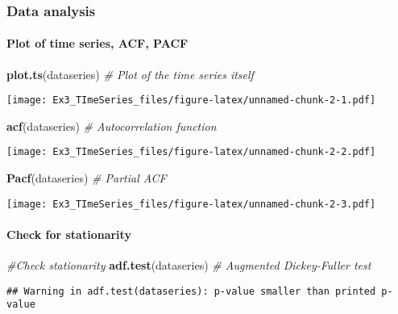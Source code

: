 \documentclass[]{article}
\newenvironment{Shaded}{\begin{snugshade}}{\end{snugshade}}
\newcommand{\KeywordTok}[1]{\textcolor[rgb]{0.13,0.29,0.53}{\textbf{#1}}}
\newcommand{\CommentTok}[1]{\textcolor[rgb]{0.56,0.35,0.01}{\textit{#1}}}
\newcommand{\NormalTok}[1]{#1}
\let\oldparagraph\paragraph
\renewcommand{\paragraph}[1]{\oldparagraph{#1}\mbox{}}
\begin{document}
\subsubsection{Data analysis}\label{data-analysis}

\paragraph{Plot of time series, ACF,
PACF}\label{plot-of-time-series-acf-pacf}

\begin{Shaded}
\begin{Highlighting}[]
\KeywordTok{plot.ts}\NormalTok{(dataseries) }\CommentTok{# Plot of the time series itself}
\end{Highlighting}
\end{Shaded}

\texttt{[image: Ex3\_TImeSeries\_files/figure-latex/unnamed-chunk-2-1.pdf]}

\begin{Shaded}
\begin{Highlighting}[]
\KeywordTok{acf}\NormalTok{(dataseries) }\CommentTok{# Autocorrelation function}
\end{Highlighting}
\end{Shaded}

\texttt{[image: Ex3\_TImeSeries\_files/figure-latex/unnamed-chunk-2-2.pdf]}

\begin{Shaded}
\begin{Highlighting}[]
\KeywordTok{Pacf}\NormalTok{(dataseries) }\CommentTok{# Partial ACF}
\end{Highlighting}
\end{Shaded}

\texttt{[image: Ex3\_TImeSeries\_files/figure-latex/unnamed-chunk-2-3.pdf]}

\paragraph{Check for stationarity}\label{check-for-stationarity}

\begin{Shaded}
\begin{Highlighting}[]
 \CommentTok{#Check stationarity}
\KeywordTok{adf.test}\NormalTok{(dataseries) }\CommentTok{# Augmented Dickey-Fuller test}
\end{Highlighting}
\end{Shaded}

\begin{verbatim}
## Warning in adf.test(dataseries): p-value smaller than printed p-value
\end{verbatim}
\end{document}
